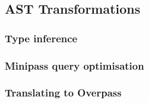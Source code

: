 \documentclass[main.tex]{subfiles}
\begin{document}
\subsection{AST Transformations}

\subsubsection{Type inference}
\label{sec:typeinf}

\subsubsection{Minipass query optimisation}

\subsubsection{Translating to Overpass}
\end{document}

